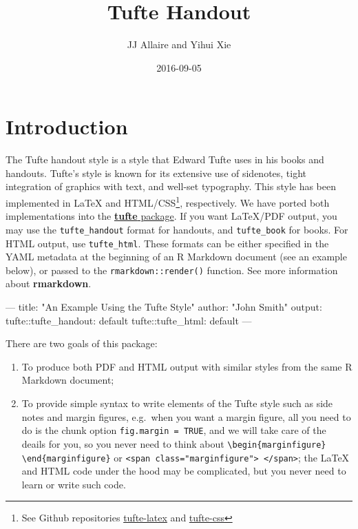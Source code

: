 \documentclass[]{tufte-handout}
\title{Tufte Handout}
\author{JJ Allaire and Yihui Xie}
\date{2016-09-05}
\newenvironment{Shaded}{}{}
\newcommand{\StringTok}[1]{\textcolor[rgb]{0.25,0.44,0.63}{{#1}}}
\newcommand{\OtherTok}[1]{\textcolor[rgb]{0.00,0.44,0.13}{{#1}}}
\newcommand{\FunctionTok}[1]{\textcolor[rgb]{0.02,0.16,0.49}{{#1}}}
\newcommand{\NormalTok}[1]{{#1}}
\begin{document}
\maketitle




\section{Introduction}\label{introduction}

The Tufte handout style is a style that Edward Tufte uses in his books
and handouts. Tufte's style is known for its extensive use of sidenotes,
tight integration of graphics with text, and well-set typography. This
style has been implemented in LaTeX and HTML/CSS\footnote{See Github
  repositories
  \href{https://github.com/tufte-latex/tufte-latex}{tufte-latex} and
  \href{https://github.com/edwardtufte/tufte-css}{tufte-css}},
respectively. We have ported both implementations into the
\href{https://github.com/rstudio/tufte}{\textbf{tufte} package}. If you
want LaTeX/PDF output, you may use the \texttt{tufte\_handout} format
for handouts, and \texttt{tufte\_book} for books. For HTML output, use
\texttt{tufte\_html}. These formats can be either specified in the YAML
metadata at the beginning of an R Markdown document (see an example
below), or passed to the \texttt{rmarkdown::render()} function. See
\citet{R-rmarkdown} more information about \textbf{rmarkdown}.

\begin{Shaded}
\begin{Highlighting}[]
\OtherTok{---}
\FunctionTok{title:} \StringTok{"An Example Using the Tufte Style"}
\FunctionTok{author:} \StringTok{"John Smith"}
\FunctionTok{output:}
  \FunctionTok{tufte:}\NormalTok{:tufte_handout: default}
  \FunctionTok{tufte:}\NormalTok{:tufte_html: default}
\OtherTok{---}
\end{Highlighting}
\end{Shaded}

There are two goals of this package:

\begin{enumerate}
\def\labelenumi{\arabic{enumi}.}
\itemsep1pt\parskip0pt
\item
  To produce both PDF and HTML output with similar styles from the same
  R Markdown document;
\item
  To provide simple syntax to write elements of the Tufte style such as
  side notes and margin figures, e.g.~when you want a margin figure, all
  you need to do is the chunk option \texttt{fig.margin = TRUE}, and we
  will take care of the deails for you, so you never need to think about
  \texttt{\textbackslash{}begin\{marginfigure\} \textbackslash{}end\{marginfigure\}}
  or
  \texttt{\textless{}span class="marginfigure"\textgreater{} \textless{}/span\textgreater{}};
  the LaTeX and HTML code under the hood may be complicated, but you
  never need to learn or write such code.
\end{enumerate}
\end{document}

